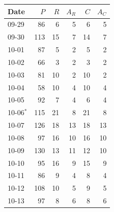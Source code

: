\caption{Daily supports for attention and aspect-expression incidence. $P$: all observed posts; $R$: related posts; $A_R$: related contributors; $C$: complete-related posts; $A_C$: complete-related contributors. Every aspect's incidence uses the account-day subsets of $C$, equally averaging the $A_C$ contributors. October 6 ($\ast$) is included in the post period; October 13 is outside the primary comparison.}
\label{tab:rq4daily}
\centering
\begin{tabular}{lrrrrr}
\toprule Date & $P$ & $R$ & $A_R$ & $C$ & $A_C$\\
\midrule
09-29 & 86 & 6 & 5 & 6 & 5\\
09-30 & 113 & 15 & 7 & 14 & 7\\
10-01 & 87 & 5 & 2 & 5 & 2\\
10-02 & 66 & 3 & 2 & 3 & 2\\
10-03 & 81 & 10 & 2 & 10 & 2\\
10-04 & 58 & 10 & 4 & 10 & 4\\
10-05 & 92 & 7 & 4 & 6 & 4\\
10-06$^{\ast}$ & 115 & 21 & 8 & 21 & 8\\
10-07 & 126 & 18 & 13 & 18 & 13\\
10-08 & 97 & 16 & 10 & 16 & 10\\
10-09 & 130 & 13 & 11 & 12 & 10\\
10-10 & 95 & 16 & 9 & 15 & 9\\
10-11 & 86 & 9 & 4 & 8 & 4\\
10-12 & 108 & 10 & 5 & 9 & 5\\
10-13 & 97 & 8 & 6 & 8 & 6\\
\bottomrule
\end{tabular}
